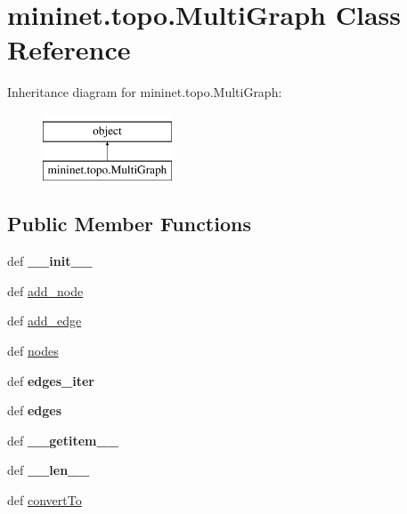 \hypertarget{classmininet_1_1topo_1_1MultiGraph}{\section{mininet.\-topo.\-Multi\-Graph Class Reference}
\label{classmininet_1_1topo_1_1MultiGraph}
}
Inheritance diagram for mininet.\-topo.\-Multi\-Graph\-:\begin{figure}[H]
\begin{center}
\leavevmode
\includegraphics[height=2.000000cm]{classmininet_1_1topo_1_1MultiGraph}
\end{center}
\end{figure}
\subsection*{Public Member Functions}
\begin{DoxyCompactItemize}
\item 
\hypertarget{classmininet_1_1topo_1_1MultiGraph_aadc9c2b3464672e4a645b4aa2baeede0}{def {\bfseries \-\_\-\-\_\-init\-\_\-\-\_\-}}\label{classmininet_1_1topo_1_1MultiGraph_aadc9c2b3464672e4a645b4aa2baeede0}

\item 
def \hyperlink{classmininet_1_1topo_1_1MultiGraph_afbaa3122caa0148f45a99dc199bba3e8}{add\-\_\-node}
\item 
def \hyperlink{classmininet_1_1topo_1_1MultiGraph_a4709b637e8eb49a7d16894a615cb0129}{add\-\_\-edge}
\item 
def \hyperlink{classmininet_1_1topo_1_1MultiGraph_ac87c6d8fe2b8213484e9c86791843cf4}{nodes}
\item 
\hypertarget{classmininet_1_1topo_1_1MultiGraph_a2edec6526901fa4dc66cee1efc146ba6}{def {\bfseries edges\-\_\-iter}}\label{classmininet_1_1topo_1_1MultiGraph_a2edec6526901fa4dc66cee1efc146ba6}

\item 
\hypertarget{classmininet_1_1topo_1_1MultiGraph_a8ebae724fa85f50caf938db7f36eaba4}{def {\bfseries edges}}\label{classmininet_1_1topo_1_1MultiGraph_a8ebae724fa85f50caf938db7f36eaba4}

\item 
\hypertarget{classmininet_1_1topo_1_1MultiGraph_a527684d708c425c0d5db27cec6ebd2cc}{def {\bfseries \-\_\-\-\_\-getitem\-\_\-\-\_\-}}\label{classmininet_1_1topo_1_1MultiGraph_a527684d708c425c0d5db27cec6ebd2cc}

\item 
\hypertarget{classmininet_1_1topo_1_1MultiGraph_a55b96e0731c2809312749dc2ae0830a5}{def {\bfseries \-\_\-\-\_\-len\-\_\-\-\_\-}}\label{classmininet_1_1topo_1_1MultiGraph_a55b96e0731c2809312749dc2ae0830a5}

\item 
def \hyperlink{classmininet_1_1topo_1_1MultiGraph_a7525c22db1e71ea973d5546669d4e56c}{convert\-To}
\end{DoxyCompactItemize}
